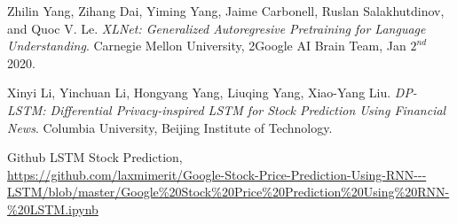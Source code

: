 \documentclass{article}
\begin{document}
\begin{thebibliography}{9}
Zhilin Yang, Zihang Dai, Yiming Yang, Jaime Carbonell, Ruslan Salakhutdinov, and Quoc V. Le. 
\textit{XLNet: Generalized Autoregresive Pretraining for Language Understanding}. 
Carnegie Mellon University, 2Google AI Brain Team, Jan $2^{nd}$ 2020.

Xinyi Li, Yinchuan Li, Hongyang Yang, Liuqing Yang, Xiao-Yang Liu.
\textit{DP-LSTM: Differential Privacy-inspired LSTM for Stock Prediction Using Financial News}. Columbia University, Beijing Institute of Technology.

Github LSTM Stock Prediction,
\\\url{https://github.com/laxmimerit/Google-Stock-Price-Prediction-Using-RNN---LSTM/blob/master/Google%20Stock%20Price%20Prediction%20Using%20RNN-%20LSTM.ipynb}
\end{thebibliography}
\end{document}
